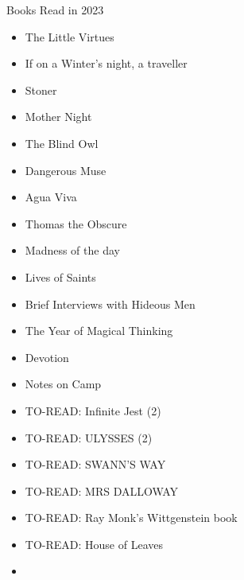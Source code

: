 Books Read in 2023
\begin{itemize}
    \item The Little Virtues
    \item If on a Winter's night, a traveller
    \item Stoner
    \item Mother Night
    \item The Blind Owl
    \item Dangerous Muse
    \item Agua Viva
    \item Thomas the Obscure
    \item Madness of the day
    \item Lives of Saints
    \item Brief Interviews with Hideous Men
    \item The Year of Magical Thinking
    \item Devotion
    \item Notes on Camp
    \item TO-READ: Infinite Jest (2)
    \item TO-READ: ULYSSES (2)
    \item TO-READ: SWANN'S WAY
    \item TO-READ: MRS DALLOWAY
    \item TO-READ: Ray Monk's Wittgenstein book
    \item TO-READ: House of Leaves
    \item 
\end{itemize}